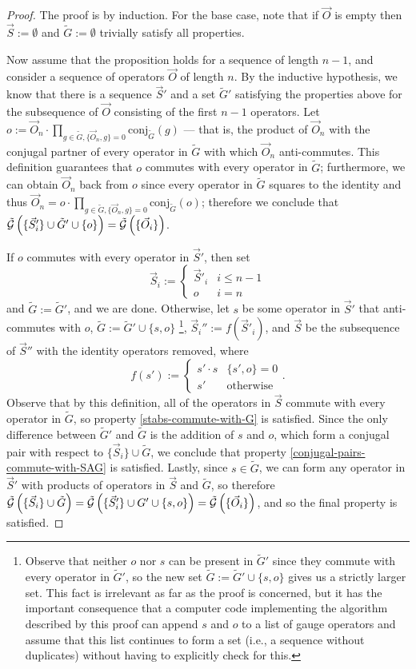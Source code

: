 \documentclass[twocolumn,showpacs,preprintnumbers,amsmath,amssymb,nofootinbib,pra,floatfix]{revtex4-1}
\newcommand{\lst}{\vec}
\newcommand{\set}{\tilde}
\newcommand{\genfun}{\tilde{\mathcal{G}}}
\begin{document}
\begin{proof}
The proof is by induction.  For the base case, note that if $\lst O$ is empty then $\lst S:=\emptyset$ and $\set G:=\emptyset$ trivially satisfy all properties.

Now assume that the proposition holds for a sequence of length $n-1$, and consider a sequence of operators $\lst O$ of length $n$.  By the inductive hypothesis, we know that there is a sequence $\lst S'$ and a set $\set G'$ satisfying the properties above for the subsequence of $\lst O$ consisting of the first $n-1$ operators.  Let $o:=\lst O_n\cdot \prod_{g\in \set G, \{\lst O_n,g\}=0} \text{conj}_{\set G}(g)$ --- that is, the product of $\lst O_n$ with the conjugal partner of every operator in $\set G$ with which $\lst O_n$ anti-commutes.  This definition guarantees that $o$ commutes with every operator in $\set G$;  furthermore, we can obtain $\lst O_n$ back from $o$ since every operator in $\set G$ squares to the identity and thus $\lst O_n=o\cdot \prod_{g\in \set G, \{\lst O_n,g\}=0} \text{conj}_{\set G}(o)$; therefore we conclude that $\genfun\paren{\{\lst S'_i\} \cup \set G' \cup \{o\}}=\genfun\paren{\{\lst O_i\}}$.

If $o$ commutes with every operator in $\lst S'$, then set
$$\lst S_i :=
\begin{cases}
\lst S'_i & i \le n-1 \\
o & i = n
\end{cases}
$$
and $\set G := \set G'$, and we are done.  Otherwise, let $s$ be some operator in $\lst S'$ that anti-commutes with $o$, $\set G:=\set G'\cup \{s,o\}$
\footnote{Observe that neither $o$ nor $s$ can be present in $\set G'$ since they commute with every operator in $\set G'$, so the new set $\set G:=\set G'\cup \{s,o\}$ gives us a strictly larger set.  This fact is irrelevant as far as the proof is concerned, but it has the important consequence that a computer code implementing the algorithm described by this proof can append $s$ and $o$ to a list of gauge operators and assume that this list continues to form a set (i.e., a sequence without duplicates) without having to explicitly check for this.}, $\lst S_i'' := f(\lst S'_i)$, and $\lst S$ be the subsequence of $\lst S''$ with the identity operators removed, where
$$
f(s') :=
\begin{cases}
s'\cdot s & \{s',o\}=0\\
s' & \text{otherwise}
\end{cases}.
$$
Observe that by this definition, all of the operators in $\lst S$ commute with every operator in $\set G$, so property \ref{stabs-commute-with-G} is satisfied.  Since the only difference between $\set G'$ and $\set G$ is the addition of $s$ and $o$, which form a conjugal pair with respect to $\{\lst S_i\} \cup \set G$, we conclude that property \ref{conjugal-pairs-commute-with-SAG} is satisfied.
Lastly, since $s\in \set G$, we can form any operator in $\lst S'$ with products of operators in $\lst S$ and $\set G$, so therefore $\genfun\paren{\{\lst S_i\} \cup \set G}=\genfun\paren{\{\lst S'_i\} \cup G' \cup \{s,o\}}=\genfun\paren{\{\lst O_i\}}$, and so the final property is satisfied.


\end{proof}
\end{document}
